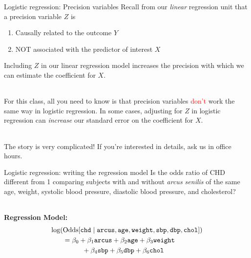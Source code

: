 \documentclass[10pt,t]{beamer}
\newcommand\tab[1][1cm]{\hspace*{#1}}
\begin{document}
\begin{frame}{Logistic regression: Precision variables}
	Recall from our \textit{linear} regression unit that a precision variable $Z$ is 
	\begin{enumerate}
		\item Causally related to the outcome $Y$
		\item NOT associated with the predictor of interest $X$ 
	\end{enumerate}
	Including $Z$ in our linear regression model increases the precision with which we can estimate the coefficient for $X$. 
	\\ ~\ 
	
	For this class, all you need to know is that precision variables \textcolor{red}{don't} work the same way in logistic regression. In some cases, adjusting for $Z$ in logistic regression can \textit{increase} our standard error on the coefficient for $X$. 
	\\ ~\ 
	
	The story is very complicated! If you're interested in details, ask us in office hours. 
\end{frame}

\begin{frame}{Logistic regression: writing the regression model}
	Is the odds ratio of CHD different from 1 comparing subjects with and without \textit{arcus senilis} of the same age, weight, systolic blood pressure, diastolic blood pressure, and cholesterol? 
	\\ ~\ 
	
	\textbf{Regression Model:}  
	\begin{align*}
		\log(&\text{Odds}[\texttt{chd} \mid \texttt{arcus}, \texttt{age}, \texttt{weight}, \texttt{sbp}, \texttt{dbp}, \texttt{chol}]) \\
		&= \beta_0 + \beta_1\texttt{arcus} + \beta_2\texttt{age} + \beta_3\texttt{weight} \\
		&\tab + \beta_4\texttt{sbp} + \beta_5\texttt{dbp} + \beta_6\texttt{chol}
	\end{align*}
\end{frame}
\end{document}
